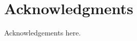\thispagestyle{empty}




\renewcommand{\dictumwidth}{\textwidth}
\chapter{Acknowledgments}
\vspace{1em}

Acknowledgements here.
\cleardoublepage{}

